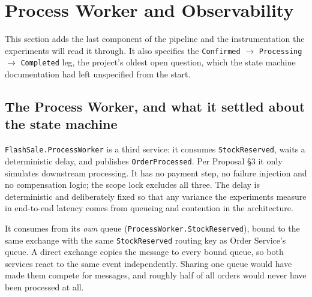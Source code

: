 \documentclass[a4paper]{report}
\begin{document}
\section{Process Worker and Observability}
\label{sec:week11}

This section adds the last component of the pipeline and the instrumentation the
experiments will read it through. It also specifies the \texttt{Confirmed}
$\to$ \texttt{Processing} $\to$ \texttt{Completed} leg, the project's oldest
open question, which the state machine documentation had left unspecified
from the start.

\subsection{The Process Worker, and what it settled about the state machine}

\texttt{FlashSale.ProcessWorker} is a third service: it consumes
\texttt{StockReserved}, waits a deterministic delay, and publishes
\texttt{OrderProcessed}. Per Proposal §3 it only simulates downstream
processing. It has no payment step, no failure injection and no compensation
logic; the scope lock excludes all three. The delay is
deterministic and deliberately fixed so that any variance the experiments measure in end-to-end
latency comes from queueing and contention in the architecture.

It consumes from its \emph{own} queue
(\texttt{ProcessWorker.StockReserved}), bound to the same exchange with the
same \texttt{StockReserved} routing key as Order Service's queue. A direct
exchange copies the message to every bound queue, so both services react to
the same event independently. Sharing one queue would have made them compete
for messages, and roughly half of all orders would never have been processed
at all.
\end{document}
